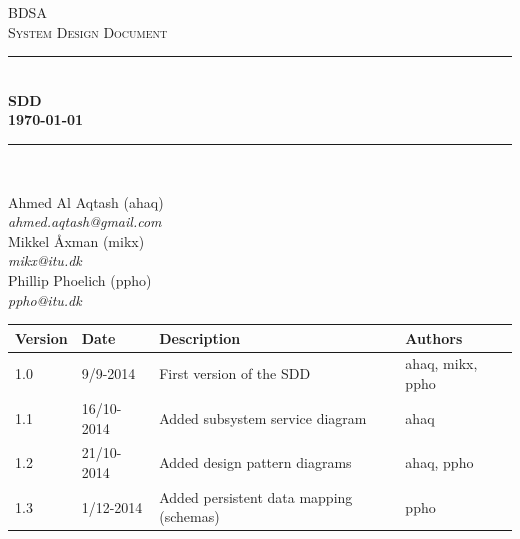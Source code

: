 \documentclass[10pt]{report}
\numberwithin{equation}{section} %
\numberwithin{figure}{section} %
\numberwithin{table}{section} %
\newcommand{\HRule}{\rule{\linewidth}{0.5mm}}
\begin{document}
\begin{titlepage}

\begin{center}

\textsc{\LARGE BDSA}\\[1.5cm]

\textsc{\Large System Design Document}\\[0.5cm]

\HRule \\[0.4cm]

{ \bfseries SDD \\[0.5cm] 
    {\small \today}} \\[0.7cm]

\HRule \\ [6.5cm]

\begin{minipage}{0.5\textwidth}
\begin{flushleft} \large
Ahmed Al Aqtash (ahaq)\\
\textit{ahmed.aqtash@gmail.com}\\
Mikkel Åxman (mikx)\\
\textit{mikx@itu.dk}\\
Phillip Phoelich (ppho)\\
\textit{ppho@itu.dk}\\

\vfill 
\end{flushleft}
\end{minipage}

\end{center}

\end{titlepage}
\clearpage
\begin{table}[h]
\begin{tabularx}{\textwidth}{l l X l}
\textbf{Version} & \textbf{Date} & \textbf{Description} & \textbf{Authors} \\ \midrule
1.0     & 9/9-2014 & First version of the SDD & ahaq, mikx, ppho \\
1.1     & 16/10-2014 & Added subsystem service diagram & ahaq\\
1.2     & 21/10-2014 & Added design pattern diagrams & ahaq, ppho\\
1.3     & 1/12-2014 & Added persistent data mapping (schemas) & ppho\\
\end{tabularx}
\end{table}
\end{document}
